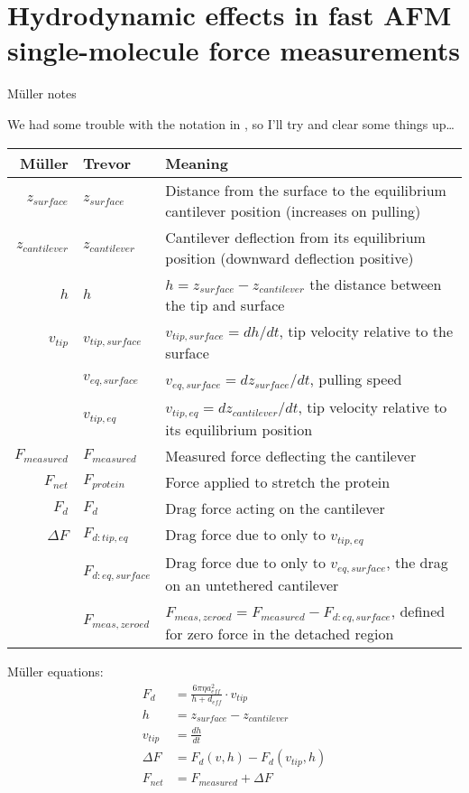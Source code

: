 \chapter{Hydrodynamic effects in fast AFM single-molecule force measurements}
\label{sec:viscocity}

\begin{center}
{\Large M\"uller notes} \\
\end{center}

We had some trouble with the notation in \citet{janovjak05}, so I'll
try and clear some things up\ldots

\begin{center}
\begin{tabular}{r|l|l}
 M\"uller \Bstrut & Trevor & Meaning \\
 \hline
 $z_{surface}$ \Tstrut & $z_{surface}$ & Distance from the surface to the equilibrium cantilever position (increases on pulling) \\
 $z_{cantilever}$ & $z_{cantilever}$ & Cantilever deflection from its equilibrium position (downward deflection positive) \\
 $h$ & $h$ & $h = z_{surface} - z_{cantilever}$ the distance between the tip and surface \\
 $v_{tip}$ & $v_{tip,surface}$ & $v_{tip,surface} = dh/dt$, tip velocity relative to the surface \\
  & $v_{eq,surface}$ & $v_{eq,surface} = dz_{surface}/dt$, pulling speed \\
  & $v_{tip,eq}$ & $v_{tip,eq} = dz_{cantilever}/dt$, tip velocity relative to its equilibrium position \\
 $F_{measured}$ & $F_{measured}$ & Measured force deflecting the cantilever \\
 $F_{net}$ & $F_{protein}$ & Force applied to stretch the protein \\
 $F_d$ & $F_d$ & Drag force acting on the cantilever \\
 $\Delta F$ & $F_{d:tip,eq}$ & Drag force due to only to $v_{tip,eq}$ \\
  & $F_{d:eq,surface}$ & Drag force due to only to $v_{eq,surface}$, the drag on an untethered cantilever \\
  & $F_{meas,zeroed}$ & $ F_{meas,zeroed} = F_{measured} - F_{d:eq,surface}$, defined for zero force in the detached region
 \end{tabular}
\end{center}

M\"uller equations:
\begin{align}
 F_d &= \frac{6 \pi \eta a_{eff}^2}{h + d_{eff}} \cdot v_{tip} \label{mul_Fd} \\
 h &= z_{surface} - z_{cantilever} \\
 v_{tip} &= \frac{dh}{dt} \\
 \Delta F &= F_d(v,h) - F_d(v_{tip}, h) \label{mul_delF} \\
 F_{net} &= F_{measured} + \Delta F \label{mul_Fnet}
\end{align}

